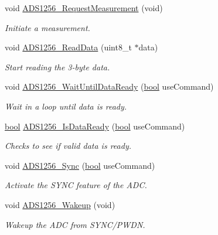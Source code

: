 \begin{DoxyCompactItemize}
void \hyperlink{group__ads1256__driver_gaa44ba74c5036ac42b24ce84eafaf56f2}{A\-D\-S1256\-\_\-\-Request\-Measurement} (void)
\begin{DoxyCompactList}\small\item\em Initiate a measurement. \end{DoxyCompactList}\item 
void \hyperlink{group__ads1256__driver_ga91d8582f9d5cb52b54fb801644e05e21}{A\-D\-S1256\-\_\-\-Read\-Data} (uint8\-\_\-t $\ast$data)
\begin{DoxyCompactList}\small\item\em Start reading the 3-\/byte data. \end{DoxyCompactList}\item 
void \hyperlink{group__ads1256__driver_ga458c5bdb28d0e87e28cdaa9cfcd5f429}{A\-D\-S1256\-\_\-\-Wait\-Until\-Data\-Ready} (\hyperlink{group__data__types_ga0ecf26b576b9a54eca656b9be7ba6a06}{bool} use\-Command)
\begin{DoxyCompactList}\small\item\em Wait in a loop until data is ready. \end{DoxyCompactList}\item 
\hyperlink{group__data__types_ga0ecf26b576b9a54eca656b9be7ba6a06}{bool} \hyperlink{group__ads1256__driver_gafa9381054942c98cb2be8881e86bc209}{A\-D\-S1256\-\_\-\-Is\-Data\-Ready} (\hyperlink{group__data__types_ga0ecf26b576b9a54eca656b9be7ba6a06}{bool} use\-Command)
\begin{DoxyCompactList}\small\item\em Checks to see if valid data is ready. \end{DoxyCompactList}\item 
void \hyperlink{group__ads1256__driver_ga612ca0b8927aa0580401813ee278348b}{A\-D\-S1256\-\_\-\-Sync} (\hyperlink{group__data__types_ga0ecf26b576b9a54eca656b9be7ba6a06}{bool} use\-Command)
\begin{DoxyCompactList}\small\item\em Activate the S\-Y\-N\-C feature of the A\-D\-C. \end{DoxyCompactList}\item 
void \hyperlink{group__ads1256__driver_ga2388b60ca886620f0daba1efc69c940a}{A\-D\-S1256\-\_\-\-Wakeup} (void)
\begin{DoxyCompactList}\small\item\em Wakeup the A\-D\-C from S\-Y\-N\-C/\-P\-W\-D\-N. \end{DoxyCompactList}\item 

\end{DoxyCompactItemize}
